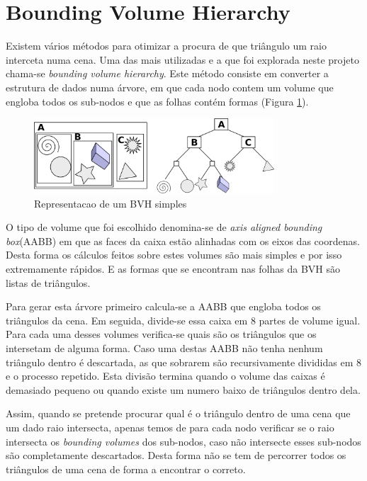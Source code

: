 \documentclass[a4paper]{report}
\begin{document}
\section{Bounding Volume Hierarchy}

Existem vários métodos para otimizar a procura de que triângulo um raio
interceta numa cena. Uma das mais utilizadas e a que foi explorada neste projeto
chama-se \textit{bounding volume hierarchy}. Este método consiste em converter a
estrutura de dados numa árvore, em que cada nodo contem um volume que engloba
todos os sub-nodos e que as folhas contém formas (Figura \ref{fig:bvh}).

\begin{figure}[h]
    \centering
        \includegraphics[width=0.8\textwidth]{images/bvh.png}
        \caption{Representacao de um BVH simples}
        \label{fig:bvh}
\end{figure}

O tipo de volume que foi escolhido denomina-se de \textit{axis aligned bounding
box}(AABB) em que as faces da caixa estão alinhadas com os eixos das coordenas.
Desta forma os cálculos feitos sobre estes volumes são mais simples e por isso
extremamente rápidos. E as formas que se encontram nas folhas da BVH são listas
de triângulos.

Para gerar esta árvore primeiro calcula-se a AABB que engloba todos os
triângulos da cena. Em seguida, divide-se essa caixa em 8 partes de volume
igual. Para cada uma desses volumes verifica-se quais são os triângulos que os
intersetam de alguma forma. Caso uma destas AABB não tenha nenhum triângulo
dentro é descartada, as que sobrarem são recursivamente divididas em 8 e o
processo repetido. Esta divisão termina quando o volume das caixas é demasiado
pequeno ou quando existe um numero baixo de triângulos dentro dela.

Assim, quando se pretende procurar qual é o triângulo dentro de uma cena que um
dado raio intersecta, apenas temos de para cada nodo verificar se o raio
intersecta os \textit{bounding volumes} dos sub-nodos, caso não intersecte esses
sub-nodos são completamente descartados. Desta forma não se tem de percorrer
todos os triângulos de uma cena de forma a encontrar o correto.
\end{document}
